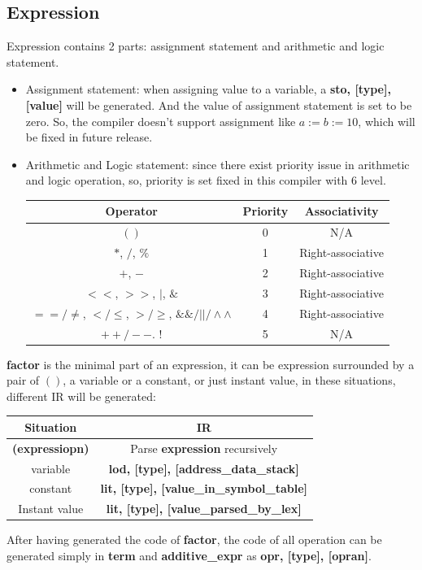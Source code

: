\documentclass{article}
\begin{document}
		\subsection{Expression}
		Expression contains 2 parts: assignment statement and arithmetic and logic statement.
		\begin{itemize}
		\item Assignment statement: when assigning value to a variable, a \textbf{sto, [type], [value]} will be generated. And the value of assignment statement is set to be zero. So, the compiler doesn't support assignment like \textbf{\emph{$ a := b := 10 $}}, which will be fixed in future release.
		\item Arithmetic and Logic statement: since there exist priority issue in arithmetic and logic operation, so, priority is set fixed in this compiler with 6 level.\\
		\begin{center}
			\begin{tabular}{ccc}
			\toprule
			Operator & Priority & Associativity\\
			\midrule
			$ () $ & 0 & N/A\\
			$ * $, $ / $, $ \% $ & 1 & Right-associative\\
			$ + $, $ - $ & 2 & Right-associative\\
			$ << $, $ >> $, $ | $, $ \& $ & 3 & Right-associative\\
			$ ==/\neq $, $ </\leq $, $ >/\geq $, $ \&\&/||/\wedge\wedge $ & 4 & Right-associative\\
			$ ++/-- $. $ ! $ & 5 & N/A\\ 
			\bottomrule
			\end{tabular}
		\end{center}
		\end{itemize}
		\textbf{factor} is the minimal part of an expression, it can be expression surrounded by a pair of $ () $, a variable or a constant, or just instant value, in these situations, different IR will be generated:\\
		\begin{center}
			\begin{tabular}{cc}
			\toprule
			Situation & IR \\
			\midrule
			\textbf{(expressiopn)} & Parse \textbf{expression} recursively \\
			variable & \textbf{lod, [type], [address\_data\_stack]}\\
			constant & \textbf{lit, [type], [value\_in\_symbol\_table]}\\
			Instant value & \textbf{lit, [type], [value\_parsed\_by\_lex]}\\
			\bottomrule
			\end{tabular}
		\end{center}
		After having generated the code of \textbf{factor}, the code of all operation can be generated simply in \textbf{term} and \textbf{additive\_expr} as \textbf{opr, [type], [opran]}.
\end{document}
